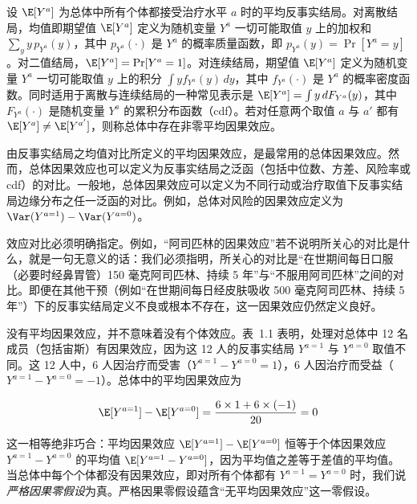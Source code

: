 \renewcommand{\TPname}{技术注记（Technical Point）}
\begin{techpoint}[总体中的因果效应]
设 $\E[Y^{a}]$ 为总体中所有个体都接受治疗水平 $a$ 时的平均反事实结局。对离散结局，均值即期望值 $\E[Y^{a}]$ 定义为随机变量 $Y^{a}$ 一切可能取值 $y$ 上的加权和 $\sum_y y\,p_{Y^{a}}(y)$，其中 $p_{Y^{a}}(\cdot)$ 是 $Y^{a}$ 的概率质量函数，即 $p_{Y^{a}}(y)=\Pr[Y^{a}=y]$。对二值结局，$\E[Y^{a}]=\Pr[Y^{a}=1]$。对连续结局，期望值 $\E[Y^{a}]$ 定义为随机变量 $Y^{a}$ 一切可能取值 $y$ 上的积分 $\int y f_{Y^{a}}(y)\,dy$，其中 $f_{Y^{a}}(\cdot)$ 是 $Y^{a}$ 的概率密度函数。同时适用于离散与连续结局的一种常见表示是 $\E[Y^{a}]=\int y\,dF_{Y^{a}}(y)$，其中 $F_{Y^{a}}(\cdot)$ 是随机变量 $Y^{a}$ 的累积分布函数（cdf）。若对任意两个取值 $a$ 与 $a'$ 都有 $\E[Y^{a}]\neq\E[Y^{a'}]$，则称总体中存在非零平均因果效应。

由反事实结局之均值对比所定义的平均因果效应，是最常用的总体因果效应。然而，总体因果效应也可以定义为反事实结局之泛函（包括中位数、方差、风险率或 cdf）的对比。一般地，总体因果效应可以定义为不同行动或治疗取值下反事实结局边缘分布之任一泛函的对比。例如，总体对风险的因果效应定义为 $\Var(Y^{a=1})-\Var(Y^{a=0})$。
\end{techpoint}
\renewcommand{\TPname}{技术注记}

效应对比必须明确指定。例如，“阿司匹林的因果效应”若不说明所关心的对比是什么，就是一句无意义的话：我们必须指明，所关心的对比是“在世期间每日口服（必要时经鼻胃管）150 毫克阿司匹林、持续 5 年”与“不服用阿司匹林”之间的对比。即便在其他干预（例如“在世期间每日经皮肤吸收 500 毫克阿司匹林、持续 5 年”）下的反事实结局定义不良或根本不存在，这一因果效应仍然定义良好。

没有平均因果效应，并不意味着没有个体效应。表~1.1 表明，处理对总体中 12 名成员（包括宙斯）有因果效应，因为这 12 人的反事实结局 $Y^{a=1}$ 与 $Y^{a=0}$ 取值不同。这 12 人中，6 人因治疗而受害（$Y^{a=1}-Y^{a=0}=1$），6 人因治疗而受益（$Y^{a=1}-Y^{a=0}=-1$）。总体中的平均因果效应为

\begin{defbox}[总体中的平均因果效应]

\[\E[Y^{a=1}]-\E[Y^{a=0}]=\frac{6\times 1+6\times(-1)}{20}=0\]

\end{defbox}

这一相等绝非巧合：平均因果效应 $\E[Y^{a=1}]-\E[Y^{a=0}]$ 恒等于个体因果效应 $Y^{a=1}-Y^{a=0}$ 的平均值 $\E[Y^{a=1}-Y^{a=0}]$，因为平均值之差等于差值的平均值。当总体中每个个体都没有因果效应，即对所有个体都有 $Y^{a=1}=Y^{a=0}$ 时，我们说\emph{严格因果零假设}为真。严格因果零假设蕴含“无平均因果效应”这一零假设。


